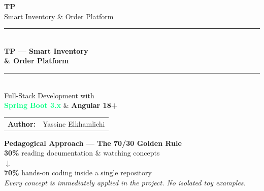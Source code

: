 \documentclass[12pt,a4paper]{report}
\begin{document}
\begin{titlepage}
\begin{center}

\vspace*{1cm}

{\Huge\textcolor{accentred}{\textbf{TP}}}\\[0.3cm]
{\large Smart Inventory \& Order Platform}\\[2cm]

\rule{\textwidth}{1.5pt}\\[0.5cm]
{\fontsize{28}{34}\selectfont\textbf{TP --- Smart Inventory}}\\[0.2cm]
{\fontsize{28}{34}\selectfont\textbf{\& Order Platform}}\\[0.5cm]
\rule{\textwidth}{1.5pt}\\[1.5cm]

{\LARGE Full-Stack Development with}\\[0.5cm]
{\Huge\textcolor{springgreen}{\textbf{Spring Boot 3.x}} \& \textcolor{angularred}{\textbf{Angular 18+}}}\\[2cm]

\begin{tabular}{rl}
\textbf{Author:} & Yassine Elkhamlichi \\[0.3cm]
\end{tabular}

\vfill

\begin{tcolorbox}[colback=accentred!5, colframe=accentred, arc=5mm, boxrule=1.5pt, width=0.85\textwidth]
\centering
\textbf{\large Pedagogical Approach --- The 70/30 Golden Rule}\\[0.3cm]
\textbf{30\%} reading documentation \& watching concepts\\
$\downarrow$\\
\textbf{70\%} hands-on coding inside a single repository\\[0.3cm]
\textit{Every concept is immediately applied in the project. No isolated toy examples.}
\end{tcolorbox}

\end{center}
\end{titlepage}

\tableofcontents
\newpage
\end{document}
